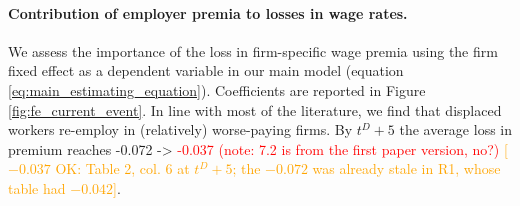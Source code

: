 \paragraph{Contribution of employer premia to losses in wage rates.} We assess the importance of the loss in firm-specific wage premia using the firm fixed effect as a dependent variable in our main model (equation \ref{eq:main_estimating_equation}). Coefficients are reported in Figure \ref{fig:fe_current_event}. In line with most of the literature, we find that displaced workers re-employ in (relatively) worse-paying firms. By $t^D+5$ the average loss in premium reaches {-0.072} -> \textcolor{red}{-0.037 (note: 7.2 is from the first paper version, no?)} \textcolor{orange}{[$-0.037$ OK: Table 2, col. 6 at $t^D+5$; the $-0.072$ was already stale in R1, whose table had $-0.042$]}. 


